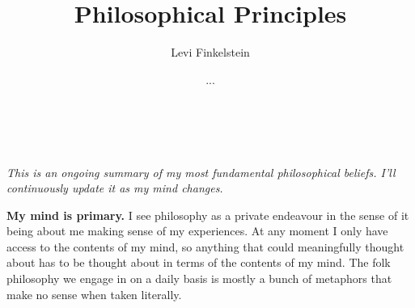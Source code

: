 \title{Philosophical Principles}
\author{Levi Finkelstein}
\date{...}


\maketitle
\\\\
\it{This is an ongoing summary of my most fundamental philosophical beliefs. I'll continuously update it as my mind changes.}

\par
\textbf{My mind is primary.} I see philosophy as a private endeavour in the sense of it being about me making sense of my experiences. At any moment I only have access to the contents of my mind, so anything that could meaningfully thought about has to be thought about in terms of the contents of my mind. The folk philosophy we engage in on a daily basis is mostly a bunch of metaphors that make no sense when taken literally. 
\par





